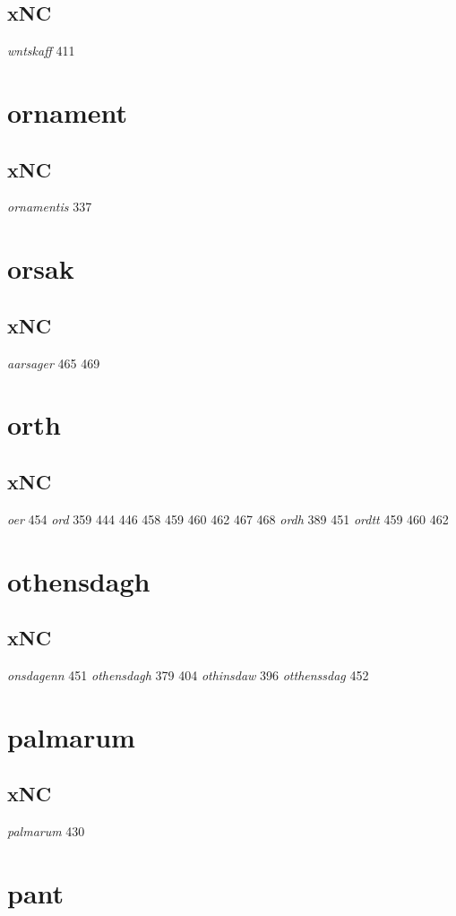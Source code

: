 \documentclass[a4paper,twocolumn]{article}
\begin{document}
\subsection{xNC}
\label{sec:org6757774}
\emph{wntskaff} 411 
\section{ornament}
\label{sec:org388c34b}
\subsection{xNC}
\label{sec:org8bc0a4a}
\emph{ornamentis} 337 
\section{orsak}
\label{sec:org6854d2a}
\subsection{xNC}
\label{sec:orge696090}
\emph{aarsager} 465 469 
\section{orth}
\label{sec:org20cda8b}
\subsection{xNC}
\label{sec:org4f9898d}
\emph{oer} 454 \emph{ord} 359 444 446 458 459 460 462 467 468 \emph{ordh} 389 451 \emph{ordtt} 459 460 462 
\section{othensdagh}
\label{sec:org7b375cd}
\subsection{xNC}
\label{sec:orgd8f4f8f}
\emph{onsdagenn} 451 \emph{othensdagh} 379 404 \emph{othinsdaw} 396 \emph{otthenssdag} 452 
\section{palmarum}
\label{sec:org46bb25f}
\subsection{xNC}
\label{sec:org8b0646e}
\emph{palmarum} 430 
\section{pant}
\label{sec:orgd9a97a1}
\end{document}
